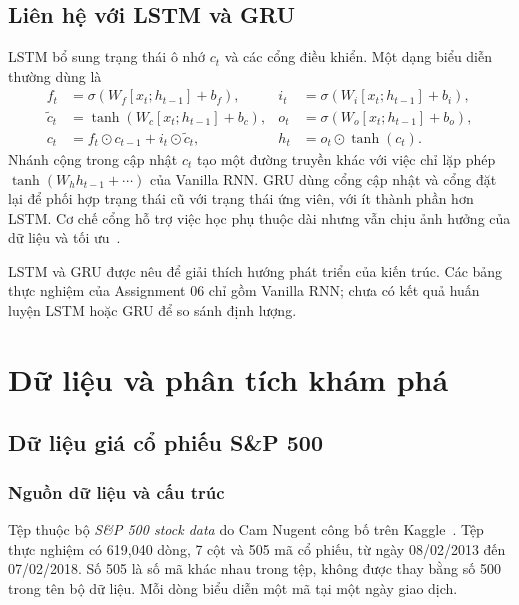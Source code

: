 \documentclass[12pt,a4paper]{report}
\begin{document}
\section{Liên hệ với LSTM và GRU}
LSTM bổ sung trạng thái ô nhớ $c_t$ và các cổng điều khiển. Một dạng biểu diễn thường dùng là
\begin{align}
f_t&=\sigma(W_f[x_t;h_{t-1}]+b_f),&
i_t&=\sigma(W_i[x_t;h_{t-1}]+b_i),\\
\widetilde c_t&=\tanh(W_c[x_t;h_{t-1}]+b_c),&
o_t&=\sigma(W_o[x_t;h_{t-1}]+b_o),\\
c_t&=f_t\odot c_{t-1}+i_t\odot\widetilde c_t,&
h_t&=o_t\odot\tanh(c_t).
\end{align}
Nhánh cộng trong cập nhật $c_t$ tạo một đường truyền khác với việc chỉ lặp phép $\tanh(W_hh_{t-1}+\cdots)$ của Vanilla RNN. GRU dùng cổng cập nhật và cổng đặt lại để phối hợp trạng thái cũ với trạng thái ứng viên, với ít thành phần hơn LSTM. Cơ chế cổng hỗ trợ việc học phụ thuộc dài nhưng vẫn chịu ảnh hưởng của dữ liệu và tối ưu~\cite{lstm,gru}.

LSTM và GRU được nêu để giải thích hướng phát triển của kiến trúc. Các bảng thực nghiệm của Assignment 06 chỉ gồm Vanilla RNN; chưa có kết quả huấn luyện LSTM hoặc GRU để so sánh định lượng.


\chapter{Dữ liệu và phân tích khám phá}
\label{chap:data}

\section{Dữ liệu giá cổ phiếu S\&P 500}
\subsection{Nguồn dữ liệu và cấu trúc}
Tệp  thuộc bộ \emph{S\&P 500 stock data} do Cam Nugent công bố trên Kaggle~\cite{stocks}. Tệp thực nghiệm có 619,040 dòng, 7 cột và 505 mã cổ phiếu, từ ngày 08/02/2013 đến 07/02/2018. Số 505 là số mã khác nhau trong tệp, không được thay bằng số 500 trong tên bộ dữ liệu. Mỗi dòng biểu diễn một mã tại một ngày giao dịch.
\end{document}
